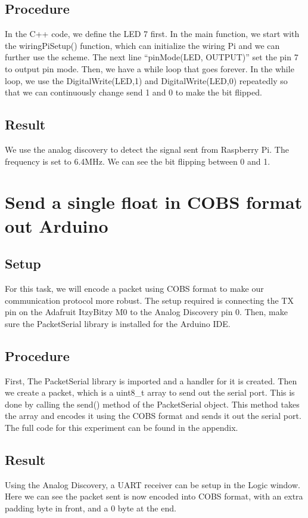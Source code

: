 \documentclass{article}
\begin{document}
	\subsection{Procedure}
	In the C++ code, we define the LED 7 first. In the main function, we start with the wiringPiSetup() function, which can initialize the wiring Pi and we can further use the scheme. The next line “pinMode(LED, OUTPUT)” set the pin 7 to output pin mode. Then, we have a while loop that goes forever. In the while loop, we use the DigitalWrite(LED,1) and DigitalWrite(LED,0) repeatedly so that we can continuously change send 1 and 0 to make the bit flipped.
	
	\subsection{Result}
	We use the analog discovery to detect the signal sent from Raspberry Pi. The frequency is set to 6.4MHz. We can see the bit flipping between 0 and 1.
	
	\clearpage
	\section{Send a single float in COBS format out Arduino}
	\subsection{Setup}
	For this task, we will encode a packet using COBS format to make our communication protocol more robust. The setup required is connecting the TX pin on the Adafruit ItzyBitzy M0 to the Analog Discovery pin 0. Then, make sure the PacketSerial library is installed for the Arduino IDE.
	\subsection{Procedure}
	First, The PacketSerial library is imported and a handler for it is created. Then we create a packet, which is a uint8\_t array to send out the serial port. This is done by calling the send() method of the PacketSerial object. This method takes the array and encodes it using the COBS format and sends it out the serial port. The full code for this experiment can be found in the appendix.
	\subsection{Result}
	Using the Analog Discovery, a UART receiver can be setup in the Logic window. Here we can see the packet sent is now encoded into COBS format, with an extra padding byte in front, and a 0 byte at the end.
	\clearpage
\end{document}
